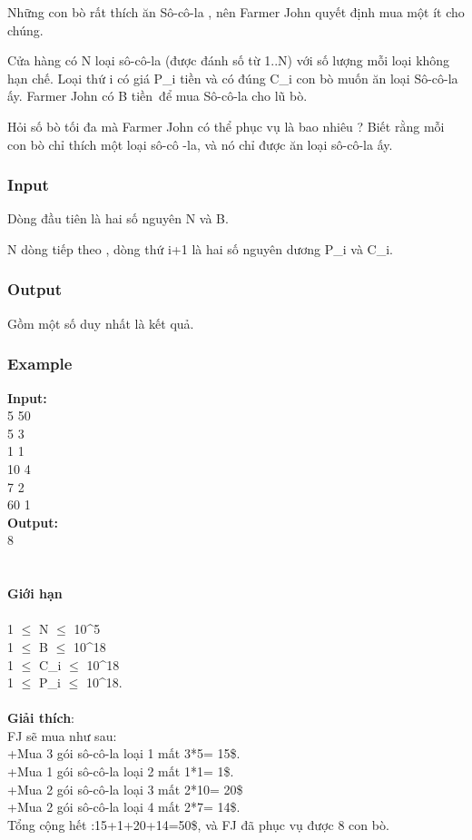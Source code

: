 

Những con bò rất thích ăn Sô-cô-la , nên Farmer John quyết định mua một ít cho chúng.

Cửa hàng có N loại sô-cô-la (được đánh số từ 1..N) với số lượng mỗi loại không hạn chế. Loại thứ i có giá P\_i tiền và có đúng C\_i con bò muốn ăn loại Sô-cô-la ấy. Farmer John có B tiền để mua Sô-cô-la cho lũ bò.

Hỏi số bò tối đa mà Farmer John có thể phục vụ là bao nhiêu ? Biết rằng mỗi con bò chỉ thích một loại sô-cô -la, và nó chỉ được ăn loại sô-cô-la ấy.

\subsubsection{Input}

Dòng đầu tiên là hai số nguyên N và B.

N dòng tiếp theo , dòng thứ i+1 là hai số nguyên dương P\_i và C\_i.

\subsubsection{Output}

Gồm một số duy nhất là kết quả.

\subsubsection{Example}

\textbf{Input:}
\\5 50
\\5 3
\\1 1
\\10 4
\\7 2
\\60 1
\\\textbf{Output:}
\\8
\\
\\
\\\textbf{​Giới hạn}
\\
\\1 $\le$ N $\le$ 10\textasciicircum5
\\1  $\le$  B  $\le$  10\textasciicircum18
\\1  $\le$  C\_i  $\le$  10\textasciicircum18
\\1  $\le$  P\_i  $\le$  10\textasciicircum18.
\\
\\\textbf{Giải thích}:
\\FJ sẽ mua như sau:
\\+Mua 3 gói sô-cô-la loại 1 mất 3*5= 15\$.
\\+Mua 1 gói sô-cô-la loại 2 mất 1*1= 1\$.
\\+Mua 2 gói sô-cô-la loại 3 mất 2*10= 20\$
\\+Mua 2 gói sô-cô-la loại 4 mất 2*7= 14\$.
\\Tổng cộng hết :15+1+20+14=50\$, và FJ đã phục vụ được 8 con bò.

 

 
